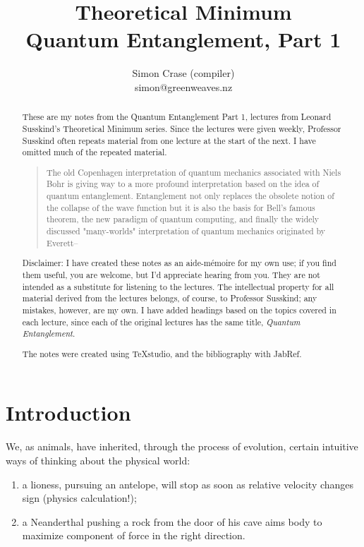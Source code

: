 \documentclass[]{article}
\title{Theoretical Minimum\\Quantum Entanglement, Part 1}
\author{Simon Crase (compiler)\\simon@greenweaves.nz}
\begin{document}
\maketitle

\begin{abstract}
These are my notes from the Quantum Entanglement Part 1, lectures\cite{susskind2013entanglement}  from Leonard Susskind's Theoretical Minimum series\cite{susskind2007theoretical}. Since the lectures were given weekly, Professor Susskind often repeats material from one lecture at the start of the next. I have omitted much of the repeated material.

	\begin{quotation}
		The old Copenhagen interpretation of quantum mechanics associated with Niels Bohr is giving way to a more profound interpretation based on the idea of quantum entanglement. Entanglement not only replaces the obsolete notion of the collapse of the wave function but it is also the basis for Bell's famous theorem, the new paradigm of quantum computing, and finally the widely discussed "many-worlds" interpretation of quantum mechanics originated by Everett--\cite{susskind2013entanglement}
	\end{quotation}

Disclaimer: I have created these notes as an aide-m\'emoire for my own use; if you find them useful, you are welcome, but I'd appreciate hearing from you. They are not intended as a substitute for listening to the lectures. The intellectual property for all material derived from the lectures belongs, of course, to Professor Susskind; any mistakes, however, are my own. I have added headings based on the topics covered in each lecture, since each of the original lectures has the same title, \emph{Quantum Entanglement}.

The notes were created using TeXstudio\cite{TexStudio}, and the bibliography with JabRef\cite{Jabref}.

\end{abstract}

\tableofcontents
\listoffigures
\listoftables
\listoftheorems[title=List of Theorems and Definitions]

\section{Introduction}

We, as animals, have inherited, through the process of evolution, certain intuitive ways of thinking about the physical world:
\begin{enumerate}
	\item a lioness, pursuing an antelope, will stop as soon as relative velocity changes sign (physics calculation!);
	\item a Neanderthal pushing a rock from the door of his cave aims body to maximize component of force in the right direction.
\end{enumerate}
\end{document}
